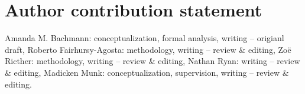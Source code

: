 \section*{Author contribution statement}
Amanda M. Bachmann: conceptualization, formal analysis, writing -- origianl draft, 
Roberto Fairhursy-Agosta: methodology, writing -- review \& editing, 
Zo\"{e} Ricther: methodology, writing -- review \& editing, 
Nathan Ryan: writing -- review \& editing, 
Madicken Munk: conceptualization, supervision, writing -- review \& editing. 
